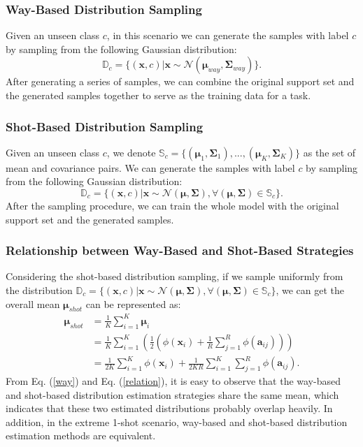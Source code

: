 \documentclass[letterpaper]{article} %
\begin{document}
\subsubsection{Way-Based Distribution Sampling} Given an unseen class $c$, in this scenario we can generate the samples with label $c$ by sampling from the following Gaussian distribution:
\begin{equation}
    \mathbb{D}_c = \{(\bm{x}, c) | \bm{x} \sim \mathcal{N}(\boldsymbol{\mu}_{way}, \bm{\Sigma}_{way})\}.
\end{equation}
After generating a series of samples, we can combine the original support set and the generated samples together to serve as the training data for a task.

\subsubsection{Shot-Based Distribution Sampling} Given an unseen class $c$, we denote $\mathbb{S}_c = \{(\boldsymbol{\mu}_1, \bm{\Sigma}_1), ...,  (\boldsymbol{\mu}_K, \bm{\Sigma}_K)\}$ as the set of mean and covariance pairs. We can generate the samples with label $c$ by sampling from the following Gaussian distribution:
\begin{equation}
	\mathbb{D}_c = \{(\bm{x}, c) | \bm{x} \sim \mathcal{N}(\boldsymbol{ \mu}, \bm{\Sigma}), \forall (\boldsymbol{ \mu}, \bm{\Sigma}) \in \mathbb{S}_c\}.
\end{equation}
After the sampling procedure, we can train the whole model with the original support set and the generated samples.

\subsubsection{Relationship between Way-Based and Shot-Based Strategies}
Considering the shot-based distribution sampling, if we sample uniformly from the distribution $\mathbb{D}_c = \{(\bm{x}, c) | \bm{x} \sim \mathcal{N}(\boldsymbol{ \mu}, \bm{\Sigma}), \forall (\boldsymbol{ \mu}, \bm{\Sigma}) \in \mathbb{S}_c\}$, we can get the overall mean $\bm{\mu}_{shot}$ can be represented as:
\begin{equation}\label{relation}
\begin{split}
	\bm{\mu}_{shot} & = \frac{1}{K}\sum_{i=1}^{K}\bm{\mu}_i \\
& = \frac{1}{K}\sum_{i=1}^{K}(\frac{1}{2}(\phi(\bm x_i)+\frac{1}{R}\sum_{j=1}^{R}\phi(\bm{a}_{ij})))\\
& = \frac{1}{2K}\sum_{i=1}^{K} \phi(\bm{x}_i) + \frac{1}{2KR} \sum_{i=1}^{K} \sum_{j=1}^{R} \phi(\bm{a}_{ij}).
\end{split}
\end{equation}
From Eq. (\ref{way}) and Eq. (\ref{relation}), it is easy to observe that the way-based and shot-based distribution estimation strategies share the same mean, which indicates that these two estimated distributions probably overlap heavily. In addition, in
the extreme 1-shot scenario, way-based and shot-based distribution estimation methods are equivalent.
\end{document}
